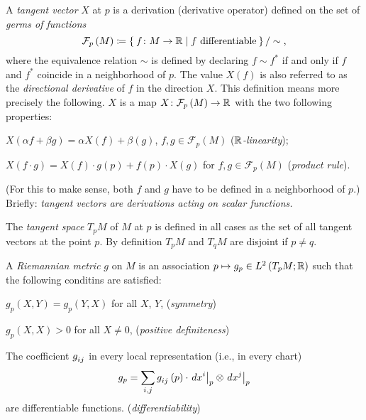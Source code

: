 \documentclass[../main.tex]{subfiles}
\begin{document}
\begin{definition}\label{Manifold:TangentVector}
A \textit{tangent vector} \(X\) at \(p\)
is a derivation (derivative operator) defined on the set of \textit{germs of functions}
\[\mathcal{F}_p\left(M\right)\coloneqq\Set{f\colon M\to\mathbb{R}|f\text{ differentiable}}/\sim\text{,}\]
where the equivalence relation \(\sim\) is defined by
declaring \(f\sim f^\ast\) if and only if
\(f\) and \(f^\ast\) coincide in a neighborhood of \(p\).
The value \(X\left(f\right)\) is also referred to as the \textit{directional derivative} of \(f\) in the direction \(X\).
This definition means more precisely the following.
\(X\) is a map \(X\colon\mathcal{F}_p\left(M\right)\to\mathbb{R}\)
with the two following properties:
\begin{APAenumerate}
\item \(X\left(\alpha f+\beta g\right)=\alpha X\left(f\right)+\beta\left(g\right)\), \(f,g\in\mathcal{F}_p\left(M\right)\) (\textit{\(\mathbb{R}\)-linearity});
\item \(X\left(f\cdot g\right)=X\left(f\right)\cdot g\left(p\right)+f\left(p\right)\cdot X\left(g\right)\) for \(f,g\in\mathcal{F}_p\left(M\right)\) (\textit{product rule}).
\end{APAenumerate}
(For this to make sense, both \(f\) and \(g\) have to be defined in a neighborhood of \(p\).)
Briefly: \textit{tangent vectors are derivations acting on scalar functions.}
\end{definition}
\begin{corollary}\label{Manifold:TangentSpace}
The \textit{tangent space} \(T_pM\) of \(M\) at \(p\)
is defined in all cases as
the set of all tangent vectors at the point \(p\).
By definition \(T_pM\) and \(T_qM\) are disjoint if \(p\ne q\).
\end{corollary}
\begin{definition}\label{Manifold:RiemannianMetric}
A \textit{Riemannian metric} \(g\) on \(M\)
is an association \(p\mapsto g_p\in L^2\left(T_pM;\mathbb{R}\right)\)
such that the following conditins are satisfied:
\begin{APAenumerate}
\item \(g_p\left(X,Y\right)=g_p\left(Y,X\right)\) for all \(X\), \(Y\), \hfill (\textit{symmetry})
\item \(g_p\left(X,X\right)>0\) for all \(X\ne0\), \hfill (\textit{positive definiteness})
\item The coefficient \(\tensor{g}{_i_j}\) in every local representation (i.e., in every chart) \[g_p=\sum_{i,j}\tensor{g}{_i_j}\left(p\right)\cdot \left.d\tensor{x}{^i}\right|_p \otimes\left.d\tensor{x}{^j}\right|_p\] are differentiable functions. \hfill (\textit{differentiability})
\end{APAenumerate}
\end{definition}
\end{document}
